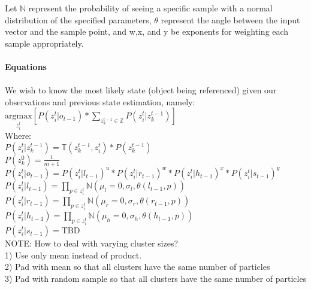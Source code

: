 \documentclass[12pt,letterpaper]{article}
\begin{document}
Let $\mathbb{N}$ represent the probability of seeing a specific sample with a  normal distribution of the specified parameters,  $\theta$ represent the angle between the input vector and the sample point, and w,x, and y be exponents for weighting each sample appropriately.\\\\
\textbf{Equations}\\\\
We wish to know the most likely state (object being referenced) given our observations and previous state estimation, namely:\\
$\underset{z^t_i}{\text{argmax}}[P(z^t_i | o_{t-1})*\displaystyle\sum_{z^{t-1}_k \in \mathbb{Z}} P(z^t_i|z^{t-1}_k)] $\\
Where:\\
$P(z^t_i | z^{t-1}_k) = \mathbb{T}(z^{t-1}_k, z^t_i)*P(z^{t-1}_k)$\\
$P(z^0_k) = \frac{1}{m+1}$\\
$P(z^t_i|o_{t-1}) = P(z^t_i|l_{t-1})^u*P(z^t_i|r_{t-1})^w*P(z^t_i|h_{t-1})^x*P(z^t_i|s_{t-1})^y$\\
$P(z^t_i|l_{t-1}) = \displaystyle \prod_{p \in z^t_i} \mathbb{N}(\mu_l=0, \sigma_l, \theta(l_{t-1}, p))$\\
$P(z^t_i|r_{t-1})=\displaystyle \prod_{p \in z^t_i} \mathbb{N}(\mu_r=0, \sigma_r, \theta(r_{t-1}, p))$\\
$P(z^t_i|h_{t-1}) =\displaystyle \prod_{p \in z^t_i} \mathbb{N}(\mu_h=0, \sigma_h, \theta(h_{t-1}, p))$\\
$P(z^t_i|s_{t-1}) = \text{TBD}$\\
NOTE: How to deal with varying cluster sizes?\\
1) Use only mean instead of product.\\
2) Pad with mean so that all clusters have the same number of particles\\
3) Pad with random sample so that all clusters have the same number of particles
\end{document}
